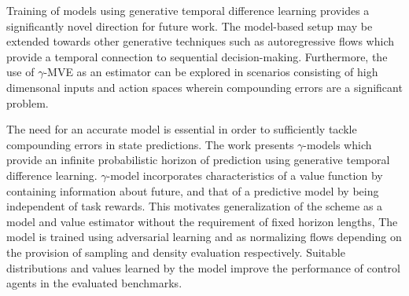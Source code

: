 \documentclass[11pt,letterpaper]{article}
\begin{document}
Training of models using generative temporal difference learning provides a significantly novel direction for future work. The model-based setup may be extended towards other generative techniques such as autoregressive flows which provide a temporal connection to sequential decision-making. Furthermore, the use of $\gamma$-MVE as an estimator can be explored in scenarios consisting of high dimensonal inputs and action spaces wherein compounding errors are a significant problem. 

The need for an accurate model is essential in order to sufficiently tackle compounding errors in state predictions. The work presents $\gamma$-models which provide an infinite probabilistic horizon of prediction using generative temporal difference learning. $\gamma$-model incorporates characteristics of a value function by containing information about future, and that of a predictive model by being independent of task rewards. This motivates generalization of the scheme as a model and value estimator without the requirement of fixed horizon lengths, The model is trained using adversarial learning and as normalizing flows depending on the provision of sampling and density evaluation respectively. Suitable distributions and values learned by the model improve the performance of control agents in the evaluated benchmarks.
\end{document}
